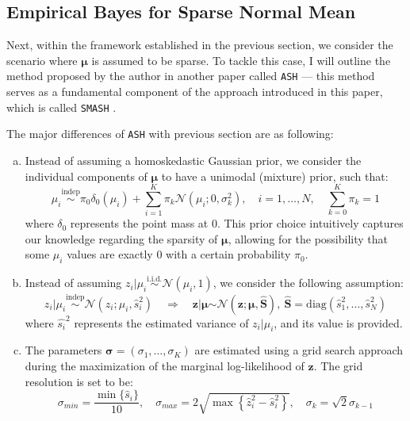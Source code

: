 \documentclass[11pt]{article}
\begin{document}
\subsection{Empirical Bayes for Sparse Normal Mean}
Next, within the framework established in the previous section, we consider the scenario where $\boldsymbol{\mu}$ is assumed to be sparse. To tackle this case, I will outline the method proposed by the author in another paper called \verb|ASH| \cite{Stephens} --- this method serves as a fundamental component of the approach introduced in this paper, which is called \verb|SMASH| \cite{Xing}. 

The major differences of \verb|ASH| with previous section are as following:
\begin{enumerate}[a)]
\item Instead of assuming a homoskedastic Gaussian prior, we consider the individual components of $\boldsymbol{\mu}$ to have a unimodal (mixture) prior, such that:
\begin{equation}
\mu_i \stackrel{\text{indep}}{\sim} \pi_0 \delta_0(\mu_i) + \sum_{i=1}^K \pi_k \mathcal{N}(\mu_i; 0, \sigma_k^2), \quad i = 1, \ldots, N, \quad \sum_{k=0}^K \pi_k = 1 
\label{ASH_assumption1}
\end{equation}
where $\delta_0$ represents the point mass at 0. This prior choice intuitively captures our knowledge regarding the sparsity of $\boldsymbol{\mu}$, allowing for the possibility that some $\mu_i$ values are exactly 0 with a certain probability $\pi_0$.

\item Instead of assuming $z_i \vert \mu_i \stackrel{\text{i.i.d.}}{\sim} \mathcal{N}(\mu_i, 1)$, we consider the following assumption:
\begin{equation}
z_i \vert \mu_i \stackrel{\text{indep}}{\sim} \mathcal{N}(z_i; \mu_i, \hat{s}_i^2) \quad \Longrightarrow \quad \boldsymbol{z} \vert \boldsymbol{\mu} \stackrel{\text{}}{\sim} \mathcal{N}(\boldsymbol{z}; \boldsymbol{\mu}, \hat{\boldsymbol{S}}), \ \hat{\boldsymbol{S}} = \text{diag}(\hat{s}_1^2, \ldots, \hat{s}_N^2) 
\label{ASH_assumption2}
\end{equation}
where $\hat{s_i}^2$ represents the estimated variance of $z_i \vert \mu_i$, and its value is provided.
\item The parameters $\boldsymbol{\sigma} = (\sigma_1, \ldots, \sigma_K)$ are estimated using a grid search approach during the maximization of the marginal log-likelihood of $\boldsymbol{z}$. The grid resolution is set to be:
$$
\sigma_{min} = \frac{\min\{\hat{s}_i\}}{10}, \quad \sigma_{max} =  2 \sqrt{\max \left\{ \hat{z}_i^2-\hat{s}_i^2\right \} }, \quad \sigma_k= \sqrt{2} \sigma_{k-1}
$$ 
\end{enumerate}
\end{document}
